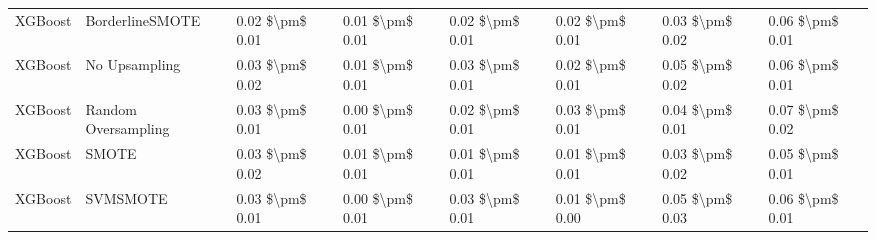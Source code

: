 \begin{tabular}{llllllll}
                        XGBoost &               BorderlineSMOTE & 0.02 \$\textbackslash pm\$ 0.01 &           0.01 \$\textbackslash pm\$ 0.01 &       0.02 \$\textbackslash pm\$ 0.01 &        0.02 \$\textbackslash pm\$ 0.01 &                         0.03 \$\textbackslash pm\$ 0.02 & 0.06 \$\textbackslash pm\$ 0.01 \\
                        XGBoost &                 No Upsampling & 0.03 \$\textbackslash pm\$ 0.02 &           0.01 \$\textbackslash pm\$ 0.01 &       0.03 \$\textbackslash pm\$ 0.01 &        0.02 \$\textbackslash pm\$ 0.01 &                         0.05 \$\textbackslash pm\$ 0.02 & 0.06 \$\textbackslash pm\$ 0.01 \\
                        XGBoost &           Random Oversampling & 0.03 \$\textbackslash pm\$ 0.01 &           0.00 \$\textbackslash pm\$ 0.01 &       0.02 \$\textbackslash pm\$ 0.01 &        0.03 \$\textbackslash pm\$ 0.01 &                         0.04 \$\textbackslash pm\$ 0.01 & 0.07 \$\textbackslash pm\$ 0.02 \\
                        XGBoost &                         SMOTE & 0.03 \$\textbackslash pm\$ 0.02 &           0.01 \$\textbackslash pm\$ 0.01 &       0.01 \$\textbackslash pm\$ 0.01 &        0.01 \$\textbackslash pm\$ 0.01 &                         0.03 \$\textbackslash pm\$ 0.02 & 0.05 \$\textbackslash pm\$ 0.01 \\
                        XGBoost &                      SVMSMOTE & 0.03 \$\textbackslash pm\$ 0.01 &           0.00 \$\textbackslash pm\$ 0.01 &       0.03 \$\textbackslash pm\$ 0.01 &        0.01 \$\textbackslash pm\$ 0.00 &                         0.05 \$\textbackslash pm\$ 0.03 & 0.06 \$\textbackslash pm\$ 0.01 \\
\bottomrule
\end{tabular}

